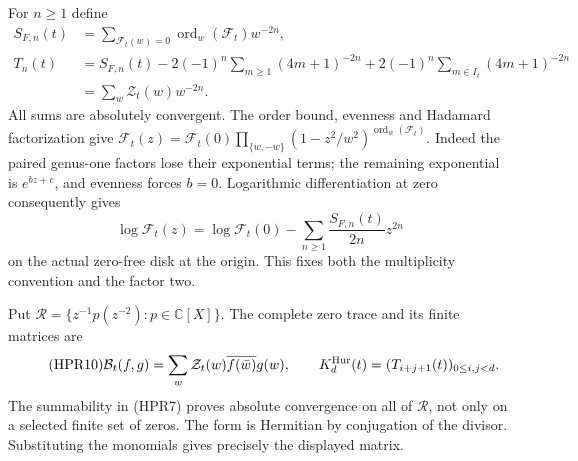 For $n\ge1$ define
\begin{equation}\tag{HPR8}
 \begin{split}
 S_{F,n}(t)&=\sum_{\mathscr F_t(w)=0}\operatorname{ord}_w(\mathscr F_t)w^{-2n},\\
 T_n(t)&=S_{F,n}(t)-2(-1)^n\sum_{m\ge1}(4m+1)^{-2n}
             +2(-1)^n\sum_{m\in I_t}(4m+1)^{-2n}\\
        &=\sum_w\mathcal Z_t(w)w^{-2n}.
 \end{split}
\end{equation}
All sums are absolutely convergent. The order bound, evenness and
Hadamard factorization give
$\mathscr F_t(z)=\mathscr F_t(0)\prod_{\{w,-w\}}(1-z^2/w^2)^{\operatorname{ord}_w(\mathscr F_t)}$.
Indeed the paired genus-one factors lose their exponential terms;
the remaining exponential is $e^{b z+c}$, and evenness forces $b=0$.
Logarithmic differentiation at zero consequently gives
\begin{equation}\tag{HPR9}
 \log \mathscr F_t(z)=\log \mathscr F_t(0)-\sum_{n\ge1}\frac{S_{F,n}(t)}{2n}z^{2n}
\end{equation}
on the actual zero-free disk at the origin. This fixes both the
multiplicity convention and the factor two.

Put $\mathcal R=\{z^{-1}p(z^{-2}):p\in\mathbb C[X]\}$.
The complete zero trace and its finite matrices are
\begin{equation}\tag{HPR10}
 \mathcal B_t(f,g)=\sum_w\mathcal Z_t(w)
                     \overline{f(\bar w)}g(w),\qquad
 K_d^{\rm Hur}(t)=(T_{i+j+1}(t))_{0\le i,j<d}.
\end{equation}
The summability in (HPR7) proves absolute convergence on all of
$\mathcal R$, not only on a selected finite set of zeros. The form
is Hermitian by conjugation of the divisor. Substituting the monomials
gives precisely the displayed matrix.

